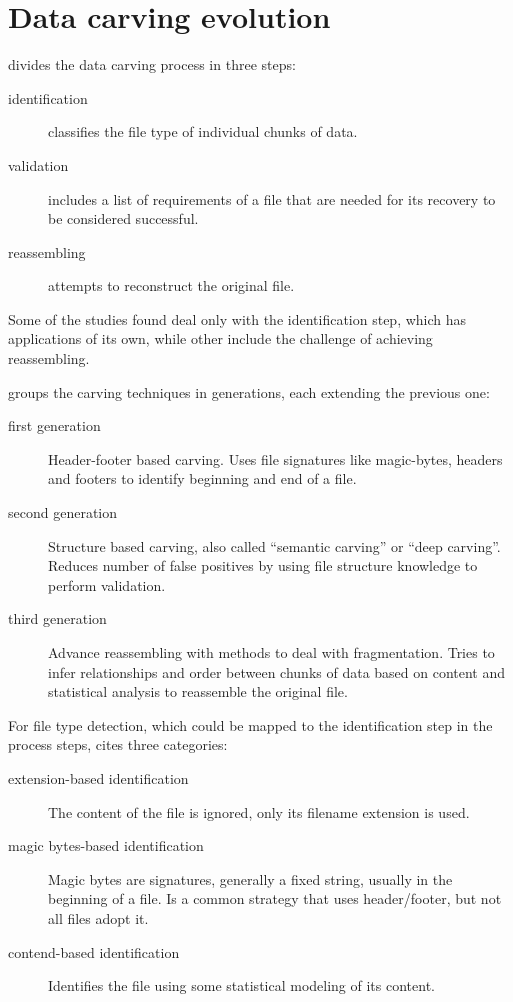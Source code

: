\section{Data carving evolution}

\cite{ali_review_2018} divides the data carving process in three steps:
\begin{description}
    \item [identification] classifies the file type of individual chunks of data. 
    \item[validation] includes a list of requirements of a file that are needed for its recovery to be considered successful.
    \item [reassembling] attempts to reconstruct the original file.
\end{description}

Some of the studies found deal only with the identification step, which has applications of its own, while other include the challenge of achieving reassembling.


\cite{nadeem_ashraf_forensic_2013} groups the carving techniques in generations, each extending the previous one:
\begin{description}
    \item [first generation] Header-footer based carving. Uses file signatures like magic-bytes, headers and footers to identify beginning and end of a file.
    \item [second generation] Structure based carving, also called ``semantic carving'' or ``deep carving''. Reduces number of false positives by using file structure knowledge to perform validation.
    \item [third generation] Advance reassembling with methods to deal with fragmentation. Tries to infer relationships and order between chunks of data based on content and statistical analysis to reassemble the original file.
\end{description}

For file type detection, which could be mapped to the identification step in the \cite{ali_review_2018} process steps, \cite{amirani_new_2008} cites three categories:
\begin{description}
    \item [extension-based identification] The content of the file is ignored, only its filename extension is used.
    \item [magic bytes-based identification] Magic bytes are signatures, generally a fixed string, usually in the beginning of a file. Is a common strategy that uses header/footer, but not all files adopt it.
    \item [contend-based identification] Identifies the file using some statistical modeling of its content. 
\end{description}

